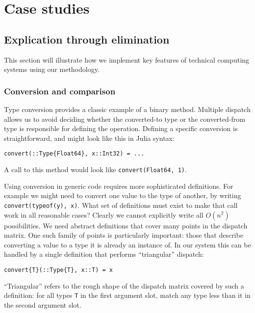 \chapter{Case studies}

\section{Explication through elimination}

This section will illustrate how we implement key features of technical computing
systems using our methodology.

\subsection{Conversion and comparison}

Type conversion provides a classic example of a binary method. Multiple
dispatch allows us to avoid deciding whether the converted-to type or the
converted-from type is responsible for defining the operation.
Defining a specific conversion is straightforward, and might look like this
in Julia syntax:

\begin{verbatim}
convert(::Type{Float64}, x::Int32) = ...
\end{verbatim}

\noindent
A call to this method would look like \texttt{convert(Float64, 1)}.

Using conversion in generic code requires more sophisticated definitions.
For example we might need to convert one value to the type of another,
by writing \texttt{convert(typeof(y), x)}. What set of definitions must
exist to make that call work in all reasonable cases? Clearly we cannot
explicitly write all $O(n^2)$ possibilities. We need abstract definitions
that cover many points in the dispatch matrix. One such family of points
is particularly important: those that describe converting a value to a
type it is already an instance of. In our system this can be handled by
a single definition that performs ``triangular'' dispatch:

\begin{verbatim}
convert{T}(::Type{T}, x::T) = x
\end{verbatim}

\noindent
``Triangular'' refers to the rough shape of the dispatch matrix covered
by such a definition: for all types \texttt{T} in the first argument slot,
match any type less than it in the second argument slot.


